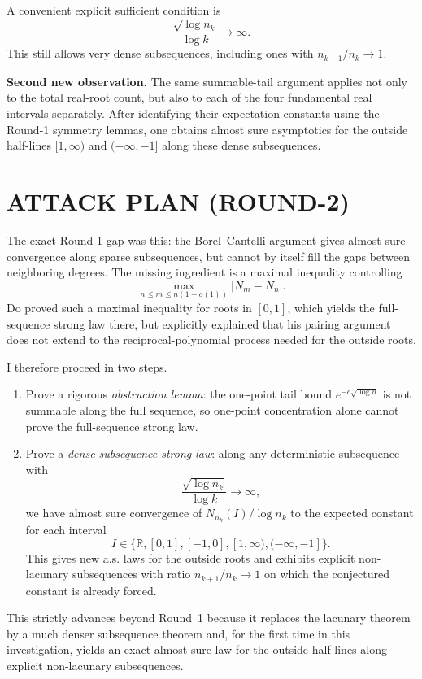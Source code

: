 A convenient explicit sufficient condition is
\[
\frac{\sqrt{\log n_k}}{\log k}\to\infty.
\]
This still allows very dense subsequences, including ones with $n_{k+1}/n_k\to 1$.

\medskip
\noindent\textbf{Second new observation.}
The same summable-tail argument applies not only to the total real-root count, but also to each of the four fundamental real intervals separately. After identifying their expectation constants using the Round-1 symmetry lemmas, one obtains almost sure asymptotics for the outside half-lines $[1,\infty)$ and $(-\infty,-1]$ along these dense subsequences.

\section{ATTACK PLAN (ROUND-2)}

The exact Round-1 gap was this: the Borel--Cantelli argument gives almost sure convergence along sparse subsequences, but cannot by itself fill the gaps between neighboring degrees. The missing ingredient is a maximal inequality controlling
\[
\max_{n\le m\le n(1+o(1))}|N_m-N_n|.
\]
Do proved such a maximal inequality for roots in $[0,1]$, which yields the full-sequence strong law there, but explicitly explained that his pairing argument does not extend to the reciprocal-polynomial process needed for the outside roots.

I therefore proceed in two steps.

\begin{enumerate}
\item Prove a rigorous \emph{obstruction lemma}: the one-point tail bound $e^{-c\sqrt{\log n}}$ is not summable along the full sequence, so one-point concentration alone cannot prove the full-sequence strong law.

\item Prove a \emph{dense-subsequence strong law}: along any deterministic subsequence with
\[
\frac{\sqrt{\log n_k}}{\log k}\to\infty,
\]
we have almost sure convergence of $N_{n_k}(I)/\log n_k$ to the expected constant for each interval
\[
I\in\{\mathbb R,[0,1],[-1,0],[1,\infty),(-\infty,-1]\}.
\]
This gives new a.s. laws for the outside roots and exhibits explicit non-lacunary subsequences with ratio $n_{k+1}/n_k\to1$ on which the conjectured constant is already forced.
\end{enumerate}

This strictly advances beyond Round~1 because it replaces the lacunary theorem by a much denser subsequence theorem and, for the first time in this investigation, yields an exact almost sure law for the outside half-lines along explicit non-lacunary subsequences.

